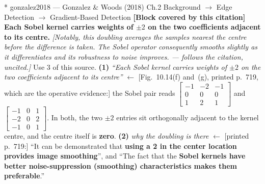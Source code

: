 \documentclass[11pt, a4paper]{article}
\makeatletter
\newcounter{citentry}
\newcommand{\citentry@core}[7]{%
  \stepcounter{citentry}
  \begingroup
  \sbox{\citentry@measurebox}{%
    \begin{minipage}{\linewidth}
      \noindent\colorbox{konstanzblue}{\parbox{\dimexpr\linewidth-2\fboxsep}{%
        \vspace{3pt}
        \textbf{\#\thecitentry \quad #2} \hfill \textit{#3}
        \vspace{3pt}
      }}
      \vspace{3pt}
      \noindent\begin{tabular}{@{}p{2.7cm} p{\dimexpr\linewidth-3cm}@{}}
        \textit{\small Sentence in thesis:} & #4 \\[5pt]
        \textbf{Usage:}\hfill       & #5 \\[5pt]
        \textit{\small Original source:}     & #6 \\[5pt]
        \textbf{How to check:}             & #7 \\
      \end{tabular}
      \vspace{5pt}
      \rule{10pt}{10pt}\quad \textbf{Validated} --- I have read the original and agree it supports the sentence.
    \end{minipage}%
  }%
  \Needspace{\dimexpr\ht\citentry@measurebox+\dp\citentry@measurebox\relax}%
  \endgroup
  \vspace{10pt}
  \noindent\colorbox{konstanzblue}{\parbox{\dimexpr\linewidth-2\fboxsep}{%
    \vspace{3pt}
    \textcolor{white}{\textbf{\#\thecitentry \quad #2}} \hfill \textcolor{white}{\textit{#3}}
    \vspace{3pt}
  }}
  \vspace{3pt}
  \noindent\begin{tabular}{@{}p{2.7cm} p{\dimexpr\linewidth-3cm}@{}}
    \textit{\small Sentence in thesis:} & \textcolor{darkgreen}{#4} \\[5pt]
    \textbf{Usage:}\hfill       & #5 \\[5pt]
    \textit{\small Original source:}     & \textcolor{darkred}{#6} \\[5pt]
    \textbf{How to check:}             & #7 \\
  \end{tabular}
  \vspace{5pt}
  \noindent\CheckBox[name=verified\thecitentry, width=10pt, height=10pt, bordercolor={0 0 0}, borderwidth=0.75, backgroundcolor={1 1 1}#1]{}\quad \textbf{Validated} --- I have read the original and agree it supports the sentence.
  \vspace{3pt}
  \noindent\textcolor{midgray}{\rule{\linewidth}{0.4pt}}
}
\newcommand{\citentry}{\@ifstar{\citentry@core{, checked}}{\citentry@core{}}}
\makeatother
\begin{document}
\begin{Form}
\citentry*
  {gonzalez2018 --- Gonzalez \& Woods (2018)}
  {Ch.2 Background $\rightarrow$ Edge Detection $\rightarrow$ Gradient-Based Detection}
  {\textbf{[Block covered by this citation]} \textbf{Each Sobel kernel carries weights of $\pm2$ on the two coefficients adjacent to its centre.} \emph{[Notably, this doubling averages the samples nearest the centre before the difference is taken. The Sobel operator consequently smooths slightly as it differentiates and its robustness to noise improves. --- follows the citation, uncited.]}}
  {Use 3 of this source.}
  {\textbf{(1)} \emph{``Each Sobel kernel carries weights of $\pm2$ on the two coefficients adjacent to its centre''} $\leftarrow$ [Fig.~10.14(f) and~(g), printed p.~719, which are the operative evidence:] the Sobel pair reads $\begin{bmatrix}-1 & -2 & -1\\ 0 & 0 & 0\\ 1 & 2 & 1\end{bmatrix}$ and $\begin{bmatrix}-1 & 0 & 1\\ -2 & 0 & 2\\ -1 & 0 & 1\end{bmatrix}$. In both, the two $\pm2$ entries sit orthogonally adjacent to the kernel centre, and the centre itself is \textbf{zero}. \quad \textbf{(2)} \emph{why the doubling is there} $\leftarrow$ [printed p.~719:] ``It can be demonstrated that \textbf{using a 2 in the center location provides image smoothing}'', and ``The fact that the \textbf{Sobel kernels have better noise-suppression (smoothing) characteristics makes them preferable}.''}

\end{Form}
\end{document}
